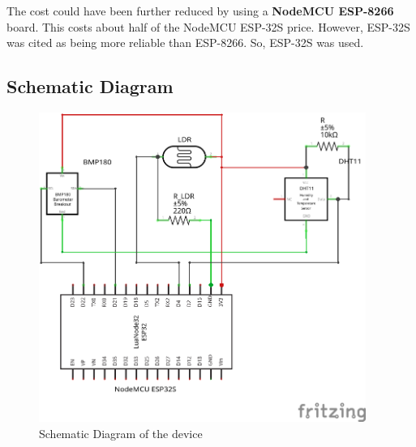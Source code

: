 \documentclass[12pt,a4paper]{article}
\begin{document}
\vspace{3mm}

The cost could have been further reduced by using a \textbf{NodeMCU ESP-8266} board.
This costs about half of the NodeMCU ESP-32S price.
However, ESP-32S was cited as being more reliable than ESP-8266.
So, ESP-32S was used.

\newpage


\subsection{Schematic Diagram}

\vspace{2cm}

\begin{figure}[h]
    \centering
    \includegraphics[width=0.95\textwidth]{./images/schematic.png}
    \caption{Schematic Diagram of the device}
\end{figure}
\end{document}
